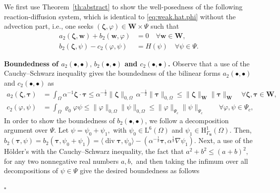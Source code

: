 \documentclass[11pt, reqno, a4paper, twoside]{article}
\newcommand{\bu}{\boldsymbol{u}}
\newcommand{\bw}{\boldsymbol{w}}
\newcommand\bzeta{\boldsymbol{\zeta}}
\newcommand\btau{\boldsymbol{\tau}}
\newcommand{\rH}{\mathrm{H}}
\newcommand{\rL}{\mathrm{L}}
\newcommand{\bW}{\mathbf{W}}
\newcommand\vdiv{\mathop{\mathrm{div}}\nolimits}
\newenvironment{proof}{\noindent{\it Proof.}}{\hfill$\square$}
\numberwithin{equation}{section}
\numberwithin{remark}{section}
\numberwithin{figure}{section}
\numberwithin{table}{section}
\newcommand{\rrb}[1]{{\leavevmode\color{lightgreen}{#1}}}
\begin{document}
{\begin{proof} 
We first use Theorem~\ref{th:abstract} to show the well-posedness of the following reaction-diffusion system, which is identical to \eqref{eq:weak.hat.phi} without the advection part, i.e., one seeks \((\bzeta,\varphi)\in\bW\times \Psi\) such that
\begin{subequations}\label{eq:weak.form.reac-diff}
\begin{align}
    a_2(\bzeta,\bw) + b_2(\bw,\varphi) & = 0 \quad \forall \bw \in \bW, \label{eq:weak,3_1}\\
    b_2(\bzeta, \psi) - c_2(\varphi,\psi) & = H(\psi) \quad \forall \psi \in \Psi. \label{eq:weak,4_1}
\end{align}
\end{subequations}


\smallskip
\noindent\textbf{Boundedness of \(a_2(\bullet,\bullet),\,b_2(\bullet,\bullet)\) and \(c_2(\bullet,\bullet)\).} Observe that a use of  the {Cauchy--Schwarz} inequality gives the
 boundedness of the bilinear forms \(a_2(\bullet,\bullet)\) and \(c_2(\bullet,\bullet)\) as
 \begin{align*}
a_2(\bzeta,\btau)&=\int_{\Omega}\alpha^{-1}\bzeta\cdot\btau\leq\alpha^{-\frac12}\|\bzeta\|_{0,\Omega}\,\alpha^{-\frac12}\|\btau\|_{0,\Omega} \leq\|\bzeta\|_{\bW}\|\btau\|_{\bW}\quad \forall \bzeta,\btau\in \bW,\\
c_2(\varphi,\psi)&=\int_{\Omega}{\varrho_0}\varphi\psi\leq\|\varphi\|_{0,\Omega}\|\psi\|_{0,\Omega}\leq \|\varphi\|_{\Psi_c}\|\psi\|_{\Psi_c}\qquad \forall \varphi, \psi \in \Psi_c,
\end{align*}
In order to show the boundedness of \(b_2(\bullet,\bullet)\), we follow a decomposition argument over \(\Psi.\) Let \(\psi=\psi_0+\psi_1,\) with \(\psi_0\in\rL^6(\Omega)\) and \(\psi_1\in\rH^1_{\Gamma_{\bu}}(\Omega).\) Then, 
\(b_2(\btau,\psi)=b_2(\btau,\psi_0+\psi_1)=\langle\vdiv\btau,\psi_0\rangle-(\alpha^{-\frac12}\btau,\alpha^{\frac12}\nabla\psi_1).\)
    Next, a use of the H\"{o}lder's  with  the {Cauchy--Schwarz} inequality, {the fact that $a^2+b^2\leq(a+b)^2,$\, for any two  {nonnegative} real numbers $a,b,$} and then taking the infimum over all decompositions of \(\psi\in\Psi\) give the desired boundedness as follows

\end{proof}}
\end{document}
